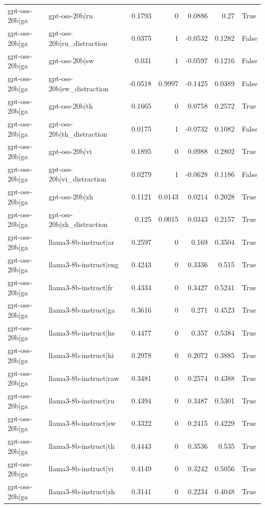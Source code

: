 \begin{table}
\begin{tabular}{l l r r r r l}
gpt-oss-20b|ga & gpt-oss-20b|ru & 0.1793 & 0 & 0.0886 & 0.27 & True \\
gpt-oss-20b|ga & gpt-oss-20b|ru_distraction & 0.0375 & 1 & -0.0532 & 0.1282 & False \\
gpt-oss-20b|ga & gpt-oss-20b|sw & 0.031 & 1 & -0.0597 & 0.1216 & False \\
gpt-oss-20b|ga & gpt-oss-20b|sw_distraction & -0.0518 & 0.9997 & -0.1425 & 0.0389 & False \\
gpt-oss-20b|ga & gpt-oss-20b|th & 0.1665 & 0 & 0.0758 & 0.2572 & True \\
gpt-oss-20b|ga & gpt-oss-20b|th_distraction & 0.0175 & 1 & -0.0732 & 0.1082 & False \\
gpt-oss-20b|ga & gpt-oss-20b|vi & 0.1895 & 0 & 0.0988 & 0.2802 & True \\
gpt-oss-20b|ga & gpt-oss-20b|vi_distraction & 0.0279 & 1 & -0.0628 & 0.1186 & False \\
gpt-oss-20b|ga & gpt-oss-20b|zh & 0.1121 & 0.0143 & 0.0214 & 0.2028 & True \\
gpt-oss-20b|ga & gpt-oss-20b|zh_distraction & 0.125 & 0.0015 & 0.0343 & 0.2157 & True \\
gpt-oss-20b|ga & llama3-8b-instruct|ar & 0.2597 & 0 & 0.169 & 0.3504 & True \\
gpt-oss-20b|ga & llama3-8b-instruct|eng & 0.4243 & 0 & 0.3336 & 0.515 & True \\
gpt-oss-20b|ga & llama3-8b-instruct|fr & 0.4334 & 0 & 0.3427 & 0.5241 & True \\
gpt-oss-20b|ga & llama3-8b-instruct|ga & 0.3616 & 0 & 0.271 & 0.4523 & True \\
gpt-oss-20b|ga & llama3-8b-instruct|he & 0.4477 & 0 & 0.357 & 0.5384 & True \\
gpt-oss-20b|ga & llama3-8b-instruct|hi & 0.2978 & 0 & 0.2072 & 0.3885 & True \\
gpt-oss-20b|ga & llama3-8b-instruct|raw & 0.3481 & 0 & 0.2574 & 0.4388 & True \\
gpt-oss-20b|ga & llama3-8b-instruct|ru & 0.4394 & 0 & 0.3487 & 0.5301 & True \\
gpt-oss-20b|ga & llama3-8b-instruct|sw & 0.3322 & 0 & 0.2415 & 0.4229 & True \\
gpt-oss-20b|ga & llama3-8b-instruct|th & 0.4443 & 0 & 0.3536 & 0.535 & True \\
gpt-oss-20b|ga & llama3-8b-instruct|vi & 0.4149 & 0 & 0.3242 & 0.5056 & True \\
gpt-oss-20b|ga & llama3-8b-instruct|zh & 0.3141 & 0 & 0.2234 & 0.4048 & True \\

\end{tabular}
\end{table}
